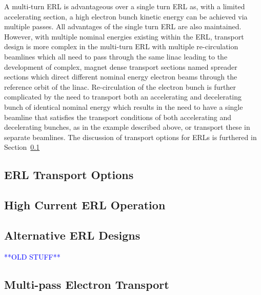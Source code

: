 \documentclass[../main.tex]{subfiles}
\begin{document}
A multi-turn ERL is advantageous over a single turn ERL as, with a limited accelerating section, a high electron bunch kinetic energy can be achieved via multiple passes. All advantages of the single turn ERL are also maintained. However, with multiple nominal energies existing within the ERL, transport design is more complex in the multi-turn ERL with multiple re-circulation beamlines which all need to pass through the same linac leading to the development of complex, magnet dense transport sections named spreader sections which direct different nominal energy electron beams through the reference orbit of the linac. Re-circulation of the electron bunch is further complicated by the need to transport both an accelerating and decelerating bunch of identical nominal energy which results in the need to have a single beamline that satisfies the transport conditions of both accelerating and decelerating bunches, as in the example described above, or transport these in separate beamlines. The discussion of transport options for ERLs is furthered in Section~\ref{sec:ERL_transport_options} 

\subsection{ERL Transport Options}
\label{sec:ERL_transport_options}

\subsection{High Current ERL Operation}

\subsection{Alternative ERL Designs}




\textcolor{blue}{**OLD STUFF**}

\subsection{Multi-pass Electron Transport}
\end{document}
